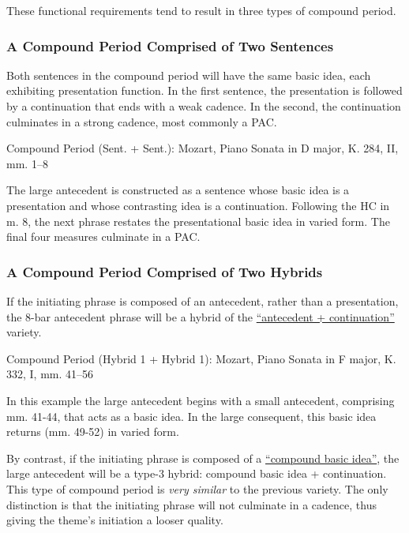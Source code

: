 \documentclass{book}
\begin{document}
These functional requirements tend to result in three types of compound
period.

\hypertarget{a-compound-period-comprised-of-two-sentences}{%
\subsubsection{A Compound Period Comprised of Two
Sentences}\label{a-compound-period-comprised-of-two-sentences}}

Both sentences in the compound period will have the same basic idea, each
exhibiting presentation function. In the first sentence, the presentation is
followed by a continuation that ends with a weak cadence. In the second, the
continuation culminates in a strong cadence, most commonly a PAC.

Compound Period (Sent. + Sent.): Mozart, Piano Sonata in D major, K. 284, II,
mm. 1--8

The large antecedent is constructed as a sentence whose basic idea is a
presentation and whose contrasting idea is a continuation. Following the HC in
m. 8, the next phrase restates the presentational basic idea in varied form.
The final four measures culminate in a PAC.

\hypertarget{a-compound-period-comprised-of-two-hybrids}{%
\subsubsection{A Compound Period Comprised of Two
Hybrids}\label{a-compound-period-comprised-of-two-hybrids}}

If the initiating phrase is composed of an antecedent, rather than a
presentation, the 8-bar antecedent phrase will be a hybrid of the
\href{hybridThemes.html\#hybrid-1}{``antecedent + continuation''} variety.

Compound Period (Hybrid 1 + Hybrid 1): Mozart, Piano Sonata in F major, K.
332, I, mm. 41--56

In this example the large antecedent begins with a small antecedent,
comprising mm. 41-44, that acts as a basic idea. In the large consequent, this
basic idea returns (mm. 49-52) in varied form.

By contrast, if the initiating phrase is composed of a
\href{hybridThemes.html\#the-compound-basic-idea}{``compound basic idea''},
the large antecedent will be a type-3 hybrid: compound basic idea +
continuation. This type of compound period is \emph{very similar} to the
previous variety. The only distinction is that the initiating phrase will not
culminate in a cadence, thus giving the theme's initiation a looser quality.
\end{document}

